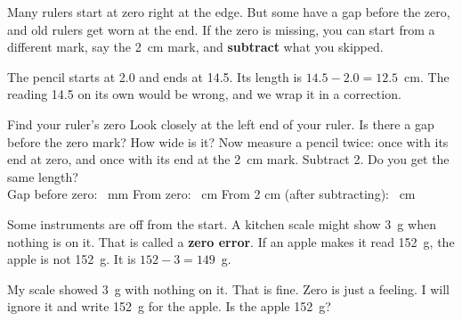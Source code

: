 Many rulers start at zero right at the edge. But some have a gap before the zero, and old rulers get worn at the end. If the zero is missing, you can start from a different mark, say the 2~cm mark, and \textbf{subtract} what you skipped.

\begin{center}
\end{center}

The pencil starts at 2.0 and ends at 14.5. Its length is $14.5-2.0=12.5$~cm. The reading 14.5 on its own would be wrong, and we wrap it in a correction.

\begin{center}
\end{center}

\begin{tryit}{Find your ruler's zero}
Look closely at the left end of your ruler. Is there a gap before the zero mark? How wide is it? Now measure a pencil twice: once with its end at zero, and once with its end at the 2~cm mark. Subtract 2. Do you get the same length?\\[4pt]
Gap before zero: \wline[1.8cm]~mm \qquad From zero: \wline[1.6cm]~cm \qquad From 2 cm (after subtracting): \wline[1.6cm]~cm
\end{tryit}

Some instruments are off from the start. A kitchen scale might show 3~g when nothing is on it. That is called a \textbf{zero error}. If an apple makes it read 152~g, the apple is not 152~g. It is $152-3=149$~g.

\begin{multix}[hmm]\multixbot[hmm]\tcblower
My scale showed 3~g with nothing on it. That is fine. Zero is just a feeling. I will ignore it and write 152~g for the apple. Is the apple 152~g?
\end{multix}

